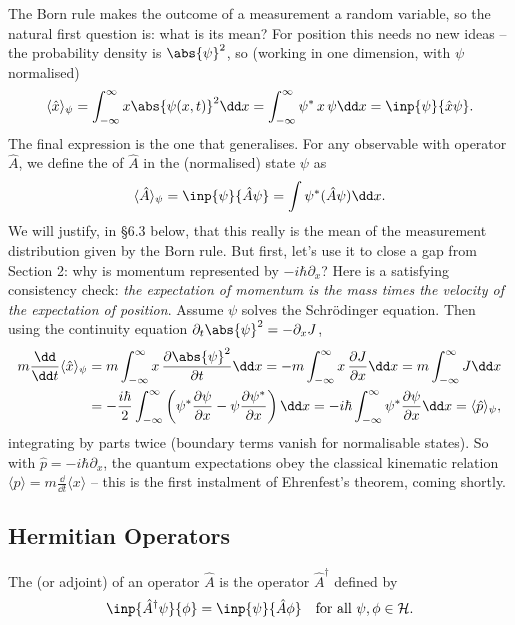 The Born rule makes the outcome of a measurement a random variable, so the natural first question is: what is its mean? For position this needs no new ideas -- the probability density is $\abs{\psi}^2$, so (working in one dimension, with $\psi$ normalised)
$$
\langle \hat{x} \rangle_\psi = \int_{-\infty}^{\infty} x \abs{\psi(x, t)}^2 \dd x = \int_{-\infty}^{\infty} \psi^* \, x \, \psi \dd x = \inp{\psi}{\hat{x} \psi}.
$$
The final expression is the one that generalises. For any observable with operator $\hat{A}$, we define the  of $\hat A$ in the (normalised) state $\psi$ as
$$
\langle \hat{A} \rangle_\psi = \inp{\psi}{\hat{A} \psi} = \int \psi^* (\hat{A} \psi) \dd x.
$$
We will justify, in \S 6.3 below, that this really is the mean of the measurement distribution given by the Born rule. But first, let's use it to close a gap from Section 2: why is momentum represented by $-i\hbar \partial_x$? Here is a satisfying consistency check: \emph{the expectation of momentum is the mass times the velocity of the expectation of position}. Assume $\psi$ solves the Schr\"odinger equation. Then using the continuity equation $\partial_t \abs{\psi}^2 = -\partial_x J$,
\begin{align*}
    m \frac{\dd}{\dd t} \langle \hat x \rangle_\psi
    &= m \int_{-\infty}^{\infty} x \, \frac{\partial \abs{\psi}^2}{\partial t} \dd x
    = -m \int_{-\infty}^{\infty} x \, \frac{\partial J}{\partial x} \dd x
    = m \int_{-\infty}^{\infty} J \dd x \\
    &= -\frac{i \hbar}{2} \int_{-\infty}^{\infty} \left( \psi^* \frac{\partial \psi}{\partial x} - \psi \frac{\partial \psi^*}{\partial x} \right) \dd x
    = -i\hbar \int_{-\infty}^{\infty} \psi^* \frac{\partial \psi}{\partial x} \dd x = \langle \hat{p} \rangle_\psi,
\end{align*}
integrating by parts twice (boundary terms vanish for normalisable states). So with $\hat{p} = -i\hbar\partial_x$, the quantum expectations obey the classical kinematic relation $\langle p \rangle = m \frac{\dd}{\dd t}\langle x \rangle$ -- this is the first instalment of Ehrenfest's theorem, coming shortly.

\subsection{Hermitian Operators}

\begin{definition}
    The  (or adjoint) of an operator $\hat{A}$ is the operator $\hat{A}^\dagger$ defined by
    $$
    \inp{\hat{A}^\dagger \psi}{\phi} = \inp{\psi}{\hat{A} \phi} \quad \text{for all } \psi, \phi \in \mathcal{H}.
    $$
\end{definition}

